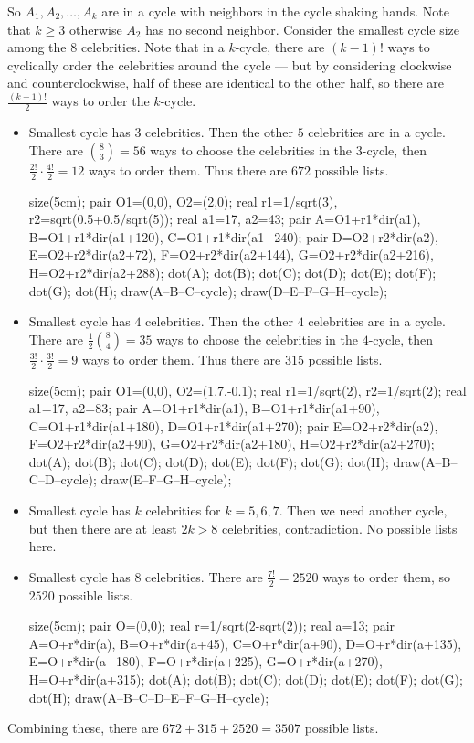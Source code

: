 So $A_1,A_2,\ldots,A_k$ are in a cycle with neighbors in the cycle shaking hands. Note that $k\geq3$ otherwise $A_2$ has no second neighbor. Consider the smallest cycle size among the $8$ celebrities. Note that in a $k$-cycle, there are $\left(k-1\right)!$ ways to cyclically order the celebrities around the cycle --- but by considering clockwise and counterclockwise, half of these are identical to the other half, so there are $\frac{\left(k-1\right)!}{2}$ ways to order the $k$-cycle.
\begin{itemize}
	\item Smallest cycle has $3$ celebrities. Then the other $5$ celebrities are in a cycle. There are $\binom{8}{3}=56$ ways to choose the celebrities in the $3$-cycle, then $\frac{2!}{2}\cdot\frac{4!}{2}=12$ ways to order them. Thus there are $672$ possible lists.
	\begin{center}
		\begin{asy}
			size(5cm);
			pair O1=(0,0), O2=(2,0);
			real r1=1/sqrt(3), r2=sqrt(0.5+0.5/sqrt(5));
			real a1=17, a2=43;
			pair A=O1+r1*dir(a1), B=O1+r1*dir(a1+120), C=O1+r1*dir(a1+240);
			pair D=O2+r2*dir(a2), E=O2+r2*dir(a2+72), F=O2+r2*dir(a2+144), G=O2+r2*dir(a2+216), H=O2+r2*dir(a2+288);
			dot(A); dot(B); dot(C); dot(D); dot(E); dot(F); dot(G); dot(H);
			draw(A--B--C--cycle);
			draw(D--E--F--G--H--cycle);
		\end{asy}
	\end{center}
	\item Smallest cycle has $4$ celebrities. Then the other $4$ celebrities are in a cycle. There are $\frac{1}{2}\binom{8}{4}=35$ ways to choose the celebrities in the $4$-cycle, then $\frac{3!}{2}\cdot\frac{3!}{2}=9$ ways to order them. Thus there are $315$ possible lists.
	\begin{center}
		\begin{asy}
			size(5cm);
			pair O1=(0,0), O2=(1.7,-0.1);
			real r1=1/sqrt(2), r2=1/sqrt(2);
			real a1=17, a2=83;
			pair A=O1+r1*dir(a1), B=O1+r1*dir(a1+90), C=O1+r1*dir(a1+180), D=O1+r1*dir(a1+270);
			pair E=O2+r2*dir(a2), F=O2+r2*dir(a2+90), G=O2+r2*dir(a2+180), H=O2+r2*dir(a2+270);
			dot(A); dot(B); dot(C); dot(D); dot(E); dot(F); dot(G); dot(H);
			draw(A--B--C--D--cycle);
			draw(E--F--G--H--cycle);
		\end{asy}
	\end{center}
	\item Smallest cycle has $k$ celebrities for $k=5,6,7$. Then we need another cycle, but then there are at least $2k>8$ celebrities, contradiction. No possible lists here.
	\item Smallest cycle has $8$ celebrities. There are $\frac{7!}{2}=2520$ ways to order them, so $2520$ possible lists.
	\begin{center}
		\begin{asy}
			size(5cm);
			pair O=(0,0);
			real r=1/sqrt(2-sqrt(2));
			real a=13;
			pair A=O+r*dir(a), B=O+r*dir(a+45), C=O+r*dir(a+90), D=O+r*dir(a+135), E=O+r*dir(a+180), F=O+r*dir(a+225), G=O+r*dir(a+270), H=O+r*dir(a+315);
			dot(A); dot(B); dot(C); dot(D); dot(E); dot(F); dot(G); dot(H);
			draw(A--B--C--D--E--F--G--H--cycle);
		\end{asy}
	\end{center}
\end{itemize}
Combining these, there are $672+315+2520=\boxed{3507}$ possible lists.